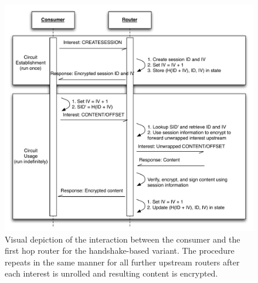\begin{figure}[ht!]
\begin{center}
\includegraphics[scale=0.65]{./images/circuit_usage.pdf}
\end{center}
\caption{Visual depiction of the interaction between the consumer and the first hop router for the handshake-based variant. The procedure repeats in the same manner for all further upstream routers after each interest is unrolled and resulting content is encrypted.}
\label{fig:circuit_usage}
\end{figure}

